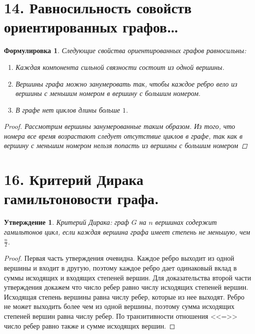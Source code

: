 \documentclass[a4paper,12pt]{article}
\newtheorem*{statement}{Формулировка}
\newtheorem*{Statements}{Утверждение}
\begin{document}
    \section*{14. Равносильность совойств ориентированных графов\ldots}
    \begin{statement}
        Следующие свойства ориентированных графов равносильны:
        \begin{enumerate}
            \item Каждая компонента сильной связности состоит из одной вершины.
            \item Вершины графа можно занумеровать так, чтобы каждое ребро вело из вершины с меньшим номером в вершину с большим номером.
            \item В графе нет циклов длины больше $1$.
        \end{enumerate}
        \begin{proof}
            Рассмотрим вершины занумерованные таким образом. Из того, что номера все время возрастают следует отсутствие циклов в графе, так как в вершину с меньшим номером нельзя попасть из вершины с большим номером
        \end{proof}
    \end{statement}

    \section*{16. Критерий Дирака гамильтоновости графа.}
    \begin{Statements}
        Критерий Дирака: граф $G$ на $n$ вершинах содержит гамильтонов цикл,
        если каждая вершина графа имеет степень не меньшую, чем $\frac{n}{2}$.
    \end{Statements}

    \begin{proof}
        Первая часть утверждения очевидна. Каждое ребро выходит из одной вершины и входит в другую, поэтому каждое ребро дает одинаковый вклад в суммы исходящих и входящих степеней вершин. Для доказательства второй части утверждения докажем что число ребер равно числу исходящих степеней вершин. Исходящая степень вершины равна числу ребер, которые из нее выходят. Ребро не может выходить более чем из одной вершины, поэтому сумма исходящих степеней вершин равна числу ребер. По транзитивности отношения <<=>> число ребер равно также и сумме исходящих вершин.
    \end{proof}
\end{document}
